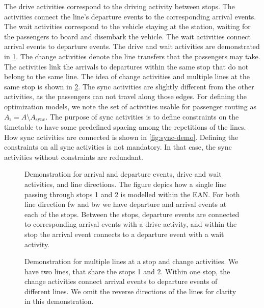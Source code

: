 \documentclass[english, 12pt, a4paper, sci, utf8, a-2b, online]{aaltothesis}
\newcommand{\Async}{A_\text{sync}}
\newcommand{\Ar}{A_\text{r}}
\begin{document}
The drive activities correspond to the driving activity between stops. The activities connect the line's departure events to the corresponding arrival events. The wait activities correspond to the vehicle staying at the station, waiting for the passengers to board and disembark the vehicle. The wait activities connect arrival events to departure events. The drive and wait activities are demonstrated in \cref{fig:drive-wait-demo}. The change activities denote the line transfers that the passengers may take. The activities link the arrivals to departures within the same stop that do not belong to the same line. The idea of change activities and multiple lines at the same stop is shown in \cref{fig:change-demo}. The sync activities are slightly different from the other activities, as the passengers can not travel along those edges. For defining the optimization models, we note the set of activities usable for passenger routing as $\Ar = A \setminus \Async$. The purpose of sync activities is to define constraints on the timetable to have some predefined spacing among the repetitions of the lines. How sync activities are connected is shown in \cref{fig:sync-demo}. Defining the constraints on all sync activities is not mandatory. In that case, the sync activities without constraints are redundant.


\begin{figure}
    \centering
    

    \caption{Demonstration for arrival and departure events, drive and wait activities, and line directions. The figure depics how a single line passing through stops 1 and 2 is modelled within the EAN. For both line direction fw and bw we have departure and arrival events at each of the stops. Between the stops, departure events are connected to corresponding arrival events with a drive activity, and within the stop the arrival event connects to a departure event with a wait activity.}
    \label{fig:drive-wait-demo}
\end{figure}




\begin{figure}
    \centering
    
    \caption{Demonstration for multiple lines at a stop and change activities. We have two lines, that share the stops 1 and 2. Within one stop, the change activities connect arrival events to departure events of different lines. We omit the reverse directions of the lines for clarity in this demonstration.}
    \label{fig:change-demo}
\end{figure}
\end{document}
